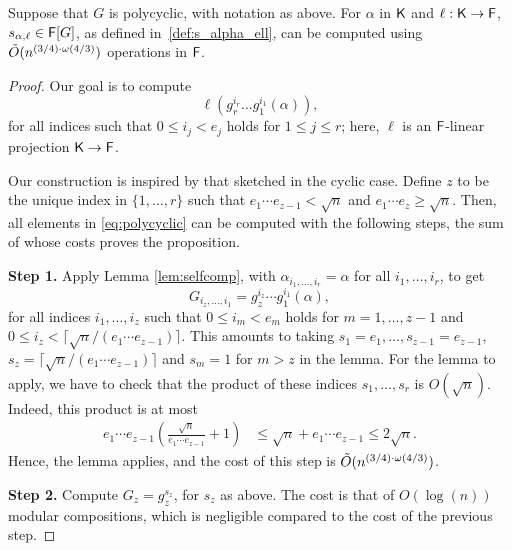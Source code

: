 \begin{proposition}\label{prop:polycyclic}
  Suppose that $G$ is polycyclic, with notation as above. For $\alpha$ in
  ${\mathsf{K}}$ and $\ell:{\mathsf{K}}\to{\mathsf{F}}$, $s_{\alpha,\ell} \in {\mathsf{F}}[G]$, as defined
  in~\eqref{def:s_alpha_ell}, can be computed using $\tilde{O}(n^{(3/4)\cdot \omega(4/3)})$
  operations in ${\mathsf{F}}$.
\end{proposition}
\begin{proof}
Our goal is to compute
\begin{equation} \label{eq:polycyclic}
  \ell (g_r^{i_r}  \ldots g_1^{i_1}(\alpha)),
\end{equation}
for all indices such that $0 \leq i_j < e_j$ holds for $1 \leq j \leq
r$; here, $\ell$ is an ${\mathsf{F}}$-linear projection ${\mathsf{K}}\to {\mathsf{F}}$.

Our construction is inspired by that sketched in the cyclic case.
Define $z$ to be the unique index in $\{1,\dots,r\}$ such that
$e_1\cdots e_{z-1} < \sqrt{n}$ and $e_1 \cdots e_{z} \geq
\sqrt{n}.$ Then, all elements in \eqref{eq:polycyclic} can be computed
with the following steps, the sum of whose costs proves the
proposition.

\smallskip\noindent \textbf{Step 1.} Apply Lemma \ref{lem:selfcomp},
with $\alpha_{i_1,\dots,i_r} = \alpha$ for all $i_1,\dots,i_r$, to get
$$ G_{i_z,\dots,i_1}=g_z^{i_z} \cdots
g_1^{i_1}(\alpha),$$ for all indices $i_1,\dots,i_z$ such that $0\leq
i_m < e_m$ holds for $m=1,\dots,z-1$ and $0\leq i_z <
\lceil{\sqrt{n}}/(e_1 \cdots e_{z-1})\rceil$.  This amounts to taking
$s_1=e_1,\dots,s_{z-1}=e_{z-1}$, $s_z=\lceil {\sqrt{n}}/(e_1 \cdots
e_{z-1})\rceil$ and $s_m = 1$ for $m > z$ in the lemma.  For the lemma to
apply, we have to check that the product of these indices
$s_1,\dots,s_r$ is $O(\sqrt n)$. 
Indeed, this product is at most 
\begin{align*}
e_1\cdots e_{z-1} \left ( \frac{\sqrt n}{e_1\cdots e_{z-1}} + 1\right )
& \le \sqrt n + e_1\cdots e_{z-1} \le 2 \sqrt n.
\end{align*}
Hence, the lemma applies, and the cost of this step is $\tilde{O}(n^{(3/4)\cdot \omega(4/3)})$.

\smallskip\noindent\textbf{Step 2.} Compute $G_z =g_z^{s_z}$, for $s_z$
as above. The cost is that of $O(\log(n))$ modular compositions, which
is negligible compared to the cost of the previous step.


\end{proof}
